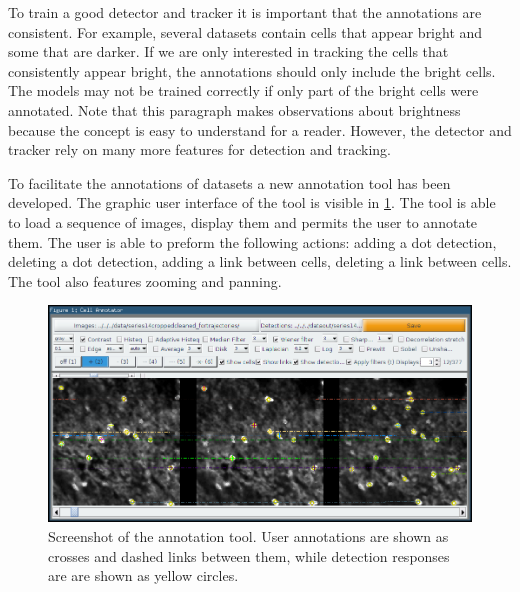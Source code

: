     	To train a good detector and tracker it is important that the annotations are consistent. For example, several datasets contain cells that appear bright and some that are darker. If we are only interested in tracking the cells that consistently appear bright, the annotations should only include the bright cells. The models may not be trained correctly if only part of the bright cells were annotated. Note that this paragraph makes observations about brightness because the concept is easy to understand for a reader. However, the detector and tracker rely on many more features for detection and tracking.
	
		To facilitate the annotations of datasets a new annotation tool has been developed. The graphic user interface of the tool is visible in \cref{fig:data_annotator_screenshot}. The tool is able to load a sequence of images, display them and permits the user to annotate them. The user is able to preform the following actions: adding a dot detection, deleting a dot detection, adding a link between cells, deleting a link between cells. The tool also features zooming and panning.
		

		\begin{figure}
			\includegraphics[width=\textwidth]{images/data_annotator_screenshot}
			\caption{Screenshot of the annotation tool. User annotations are shown as crosses and dashed links between them, while detection responses are are shown as yellow circles.}
			\label{fig:data_annotator_screenshot}
		\end{figure}
		
